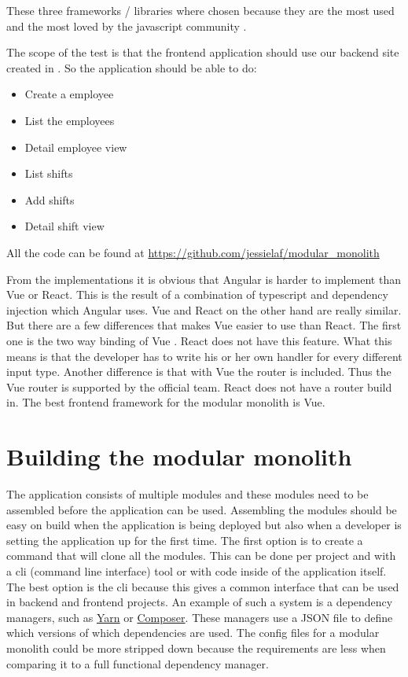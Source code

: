 These three frameworks / libraries where chosen because they are the most used and the most loved by the javascript community \cite{allFrontendFrameworks}.

The scope of the test is that the frontend application should use our backend site created in . So the application should be able to do:

\begin{itemize}
    \item Create a employee
    \item List the employees
    \item Detail employee view
    \item List shifts
    \item Add shifts
    \item Detail shift view
\end{itemize}

All the code can be found at \url{https://github.com/jessielaf/modular_monolith}

From the implementations it is obvious that Angular is harder to implement than Vue or React. This is the result of a combination of typescript and dependency injection which Angular uses. Vue and React on the other hand are really similar. But there are a few differences that makes Vue easier to use than React. The first one is the two way binding of Vue \cite{vueTwoWay}. React does not have this feature. What this means is that the developer has to write his or her own handler for every different input type. Another difference is that with Vue the router is included. Thus the Vue router is supported by the official team. React does not have a router build in. The best frontend framework for the modular monolith is Vue.

\section{Building the modular monolith}
\label{sec:BuildingModularMonolith}

The application consists of multiple modules and these modules need to be assembled before the application can be used. Assembling the modules should be easy on build when the application is being deployed but also when a developer is setting the application up for the first time. The first option is to create a command that will clone all the modules. This can be done per project and with a cli (command line interface) tool or with code inside of the application itself. The best option is the cli because this gives a common interface that can be used in backend and frontend projects. An example of such a system is a dependency managers, such as \href{https://yarnpkg.com/en/}{Yarn} or \href{https://getcomposer.org/}{Composer}. These managers use a JSON file to define which versions of which dependencies are used. The config files for a modular monolith could be more stripped down because the requirements are less when comparing it to a full functional dependency manager.

